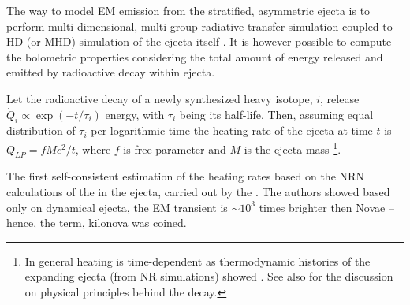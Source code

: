 
The way to model \ac{EM} emission from the stratified, asymmetric ejecta is to perform 
multi-dimensional, multi-group radiative transfer simulation coupled to \ac{HD} (or \ac{MHD}) 
simulation of the ejecta itself \cite[\eg][]{Bulla:2019muo}.
%
It is however possible to compute the bolometric properties considering the total amount 
of energy released and emitted by radioactive decay within ejecta. 

%
%



Let the radioactive decay of a newly synthesized heavy isotope, $i$, release 
$\dot{Q}_i \propto \exp(-t/\tau_i)$ energy, with $\tau_i$ being its half-life.
Then, assuming equal distribution of $\tau_i$ per logarithmic time
the heating rate of the ejecta at time $t$ is 
$\dot{Q}_{LP} = f M c^2 / t$,
where $f$ is free parameter and $M$ is the ejecta mass
\footnote{
    In general heating is time-dependent as thermodynamic histories of the expanding 
    ejecta (from \ac{NR} simulations) showed \citep{Metzger:2010,Roberts:2011,Korobkin:2012uy}.
    See also \citet{Hotokezaka:2017dbk} for the discussion on physical principles behind the decay.
}.
%

The first self-consistent estimation of the heating rates based on the \ac{NRN} 
calculations of the \rproc{} in the ejecta, carried out by the \citet{Metzger:2010}. 
The authors showed based only on dynamical ejecta, the \ac{EM} transient is ${\sim}10^3$ 
times brighter then Novae -- hence, the term, kilonova was coined. 
%
%

